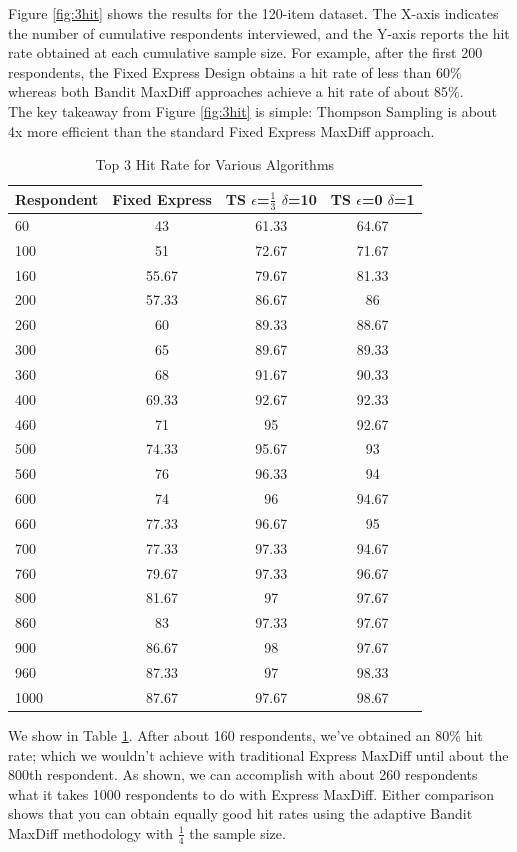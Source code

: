\documentclass[nonblindrev]{informs3}
\begin{document}
Figure \ref{fig:3hit} shows the results for the 120-item dataset.  The X-axis indicates the number of cumulative respondents interviewed, and the Y-axis reports the hit rate obtained at each cumulative sample size.  For example, after the first 200 respondents, the Fixed Express Design obtains a hit rate of less than 60\% whereas both Bandit MaxDiff approaches achieve a hit rate of about 85\%.\\
The key takeaway from Figure \ref{fig:3hit} is simple: Thompson Sampling is about 4x more efficient than the standard Fixed Express MaxDiff approach.
\begin{table}
\begin{center}
\begin{tabular}{l | c | c | c}
 Respondent& Fixed Express &  TS $\epsilon$=$\frac{1}{3}$ $\delta$=10  &TS $\epsilon$=0 $\delta$=1 \\
\hline
60&43&61.33&64.67\\
100&51&72.67&71.67\\
160&55.67&79.67&81.33 \\
200&57.33&86.67&86\\
260& 60&89.33&88.67\\
300& 65&89.67&89.33\\
360&68&91.67&90.33\\
400& 69.33&92.67&92.33\\
460&71&95&92.67 \\
500& 74.33&95.67&93\\
560&76&96.33&94\\
600&74&96&94.67\\
660& 77.33&96.67&95\\
700& 77.33&97.33&94.67\\
760&79.67&97.33&96.67\\
800& 81.67&97&97.67\\
860&83&97.33&97.67\\
900&86.67&98&97.67 \\
960&87.33&97&98.33\\
1000& 87.67&97.67&98.67\\
\hline
\end{tabular}
\end{center}
\caption{Top 3 Hit Rate for Various Algorithms}
\label{table:top3}
\end{table}
 We show in Table \ref{table:top3}. After about 160 respondents, we've obtained an 80\% hit rate; which we wouldn't achieve with traditional Express MaxDiff until about the 800th respondent.  As shown, we can accomplish with about 260 respondents what it takes 1000 respondents to do with Express MaxDiff.  Either comparison shows that you can obtain equally good hit rates using the adaptive Bandit MaxDiff methodology with $\frac{1}{4}$ the sample size.\\
\end{document}
